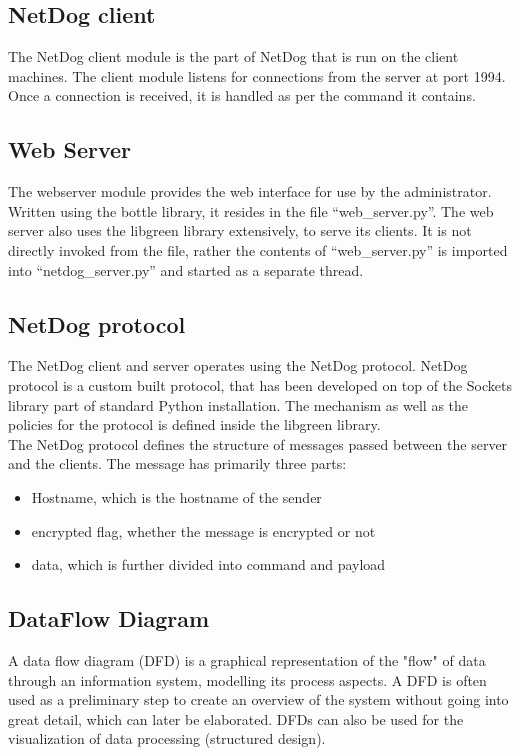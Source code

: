 \subsection{NetDog client}
\par
The NetDog client module is the part of NetDog that is run on the client
machines. The client module listens for connections from the server at port
1994. Once a connection is received, it is handled as per the command it
contains.

\subsection{Web Server}
\par
The webserver module provides the web interface for use by the administrator.
Written using the bottle library, it resides in the file ``web\_server.py''. The
web server also uses the libgreen library extensively, to serve its clients. It
is not directly invoked from the file, rather the contents of ``web\_server.py''
is imported into ``netdog\_server.py'' and started as a separate thread.

\subsection{NetDog protocol}
\par
The NetDog client and server operates using the NetDog protocol. NetDog protocol
is a custom built protocol, that has been developed on top of the Sockets
library part of standard Python installation. The mechanism as well as the
policies for the protocol is defined inside the libgreen library.\\

The NetDog protocol defines the structure of messages passed between the server
and the clients. The message has primarily three parts:

\begin{itemize}
    \item Hostname, which is the hostname of the sender
    \item encrypted flag, whether the message is encrypted or not
    \item data, which is further divided into command and payload
\end{itemize}


\subsection{DataFlow Diagram}
A data flow diagram (DFD) is a graphical representation of the "flow" of data
through an information system, modelling its process aspects. A DFD is often
used as a preliminary step to create an overview of the system without going
into great detail, which can later be elaborated. DFDs can also be used for the
visualization of data processing (structured design).\\

